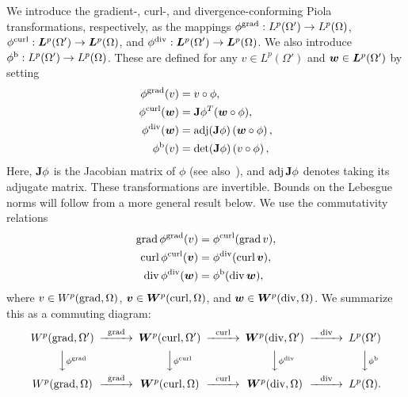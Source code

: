 \documentclass[10pt,a4paper]{article}
\begin{document}
We introduce the gradient-, curl-, and divergence-conforming Piola transformations, respectively, as the mappings 
$\phi^{\operatorname{grad}}: L^{p}(\Omega') \to L^{p}(\Omega)$,
$\phi^{\operatorname{curl}}: \bm{L}^{p}(\Omega') \to \bm{L}^{p}(\Omega)$, and 
$\phi^{\operatorname{div}}: \bm{L}^{p}(\Omega') \to \bm{L}^{p}(\Omega)$.
We also introduce 
$\phi^{\rm b}: L^{p}(\Omega') \to L^{p}(\Omega)$. 
These are defined 
for any $v \in L^{p}(\Omega')$ and $\bm{w} \in \bm{L}^{p}(\Omega')$ by setting 
\begin{subequations}\label{eq_definition_piola}
\begin{align*}
    \phi^{\operatorname{grad}}(v) &= v \circ \phi, \\
    \phi^{\operatorname{curl}}(\bm{w}) &= {\mathbf{J}}\phi^{T} (\bm{w} \circ \phi), \\
    \phi^{\operatorname{div}}(\bm{w}) &= \operatorname{adj}({\mathbf{J}}\phi) \left( \bm{w} \circ \phi \right), \\  
    \phi^{\rm b}(v) &= \det({\mathbf{J}}\phi) \left( v \circ \phi \right),
\end{align*}
\end{subequations}
Here, ${\mathbf{J}}\phi$ is the Jacobian matrix of $\phi$ (see also~\cite[Definition~9.8]{ern2021finite}), and $\operatorname{adj}{\mathbf{J}}\phi$ denotes taking its adjugate matrix.
These transformations are invertible. 
Bounds on the Lebesgue norms will follow from a more general result below. 
We use the commutativity relations 
\begin{subequations}\label{eq_piola_commute}
\begin{align}
    \operatorname{grad} \phi^{\operatorname{grad}} (v) &= \phi^{\operatorname{curl}}(\operatorname{grad} v), 
    \\
    \operatorname{curl} \phi^{\operatorname{curl}}(\bm{v}) &= \phi^{\operatorname{div}}(\operatorname{curl} \bm{v}), 
    \\
    \operatorname{div} \phi^{\operatorname{div}}(\bm{w}) &= \phi^{\rm b}(\operatorname{div} \bm{w}),
\end{align}
\end{subequations}
where $v \in W^{p}(\operatorname{grad},\Omega)$, $\bm{v} \in \bm{W}^{p}(\operatorname{curl},\Omega)$, and $\bm{w} \in \bm{W}^{p}(\operatorname{div},\Omega)$.  
We summarize this as a commuting diagram:
\begin{align*}
    \begin{CD}
        W^{p}(\grad,\Omega') @>{\grad}>> \bfW^{p}(\curl,\Omega') @>{\curl}>> \bfW^{p}(\divergence,\Omega') @>{\divergence}>> L^{p}(\Omega')
        \\
        @VV{\phi^{\grad}}V 
        @VV{\phi^{\curl}}V 
        @VV{\phi^{\divergence}}V 
        @VV{\phi^{\rm b}}V 
        \\
        W^{p}(\grad,\Omega ) @>{\grad}>> \bfW^{p}(\curl,\Omega ) @>{\curl}>> \bfW^{p}(\divergence,\Omega ) @>{\divergence}>> L^{p}(\Omega ).
    \end{CD}
\end{align*}
\end{document}
